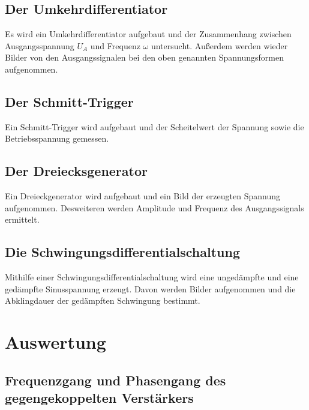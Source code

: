 \documentclass[]{scrartcl}
\let\oldsection\section
\renewcommand\section{\clearpage\oldsection}
\begin{document}
\subsection{Der Umkehrdifferentiator}
Es wird ein Umkehrdifferentiator aufgebaut und der Zusammenhang zwischen Ausgangsspannung $U_A $ und Frequenz $\omega$ untersucht. Außerdem werden wieder Bilder von den Ausgangssignalen bei den oben genannten Spannungsformen aufgenommen.

\subsection{Der Schmitt-Trigger}
Ein Schmitt-Trigger wird aufgebaut und der Scheitelwert der Spannung sowie die Betriebsspannung gemessen.

\subsection{Der Dreiecksgenerator}
Ein Dreieckgenerator wird aufgebaut und ein Bild der erzeugten Spannung aufgenommen. Desweiteren werden Amplitude und Frequenz des Ausgangssignals ermittelt.

\subsection{Die Schwingungsdifferentialschaltung}
Mithilfe einer Schwingungsdifferentialschaltung wird eine ungedämpfte und eine gedämpfte Sinusspannung erzeugt. Davon werden Bilder aufgenommen und die Abklingdauer der gedämpften Schwingung bestimmt.

\section{Auswertung}

\subsection{Frequenzgang und Phasengang des gegengekoppelten Verstärkers}
\end{document}

